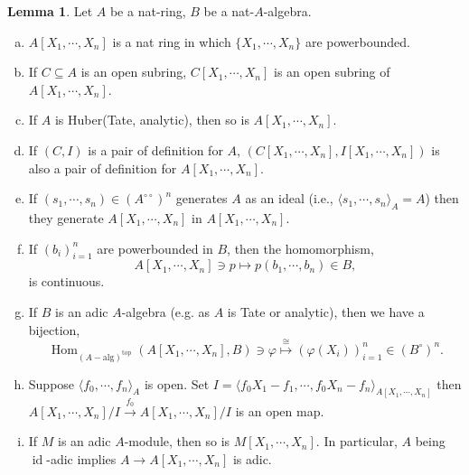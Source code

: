 \documentclass[10pt]{article}
\numberwithin{equation}{section}
\theoremstyle{definition}
\newtheorem{lemma}{Lemma}[subsection]
\DeclareMathOperator{\Hom}{Hom}
\DeclareMathOperator{\id}{id}
\newcommand{\dcirc}[0]{{\circ\circ}}
\begin{document}
\begin{lemma}
    \label{lemma_19_1}
    Let $A$ be a nat-ring, $B$ be a nat-$A$-algebra.
    \begin{enumerate}[a.]
        \item $A[X_1,\cdots,X_n]$ is a nat ring in which $\{X_1,\cdots,X_n\}$ are powerbounded.
        \item If $C\subseteq A$ is an open subring, $C[X_1,\cdots,X_n]$ is an open subring of $A[X_1,\cdots,X_n]$.
        \item If $A$ is Huber(Tate, analytic), then so is $A[X_1,\cdots,X_n]$.
        \item If $(C,I)$ is a pair of definition for $A$, $(C[X_1,\cdots,X_n],I[X_1,\cdots,X_n])$ is also a pair of definition for $A[X_1,\cdots,X_n]$.
        \item If $(s_1,\cdots,s_n)\in (A^{\dcirc})^n$ generates $A$ as an ideal (i.e., $\langle s_1,\cdots,s_n\rangle_A =A$) then they generate $A[X_1,\cdots,X_n]$ in $A[X_1,\cdots,X_n]$.
        \item If $(b_i)_{i=1}^n$ are powerbounded in $B$, then the homomorphism,
        \begin{equation*}
            A[X_1,\cdots,X_n]\ni p\mapsto p(b_1,\cdots,b_n)\in B,
        \end{equation*}
        is continuous.
        \item If $B$ is an adic $A$-algebra (e.g. as $A$ is Tate or analytic), then we have a bijection,
        \begin{equation*}
            \Hom_{(A-\mathrm{alg})^{\mathrm{top}}}(A[X_1,\cdots,X_n],B)\ni\varphi\stackrel{\cong}{\mapsto}(\varphi(X_i))_{i=1}^n\in(B^\circ)^n.
        \end{equation*}
        \item Suppose $\langle f_0,\cdots,f_n\rangle_A$ is open. Set $I=\langle f_0X_1-f_1,\cdots,f_0X_n-f_n\rangle_{A[X_1,\cdots,X_n]}$ then $A[X_1,\cdots,X_n]/I\stackrel{f_0}{\to}A[X_1,\cdots,X_n]/I$ is an open map.
        \item If $M$ is an adic $A$-module, then so is $M[X_1,\cdots,X_n]$. In particular, $A$ being $\id$-adic implies $A\to A[X_1,\cdots,X_n]$ is adic.
    \end{enumerate}
\end{lemma}
\end{document}
